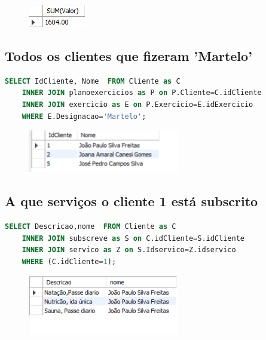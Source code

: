 \begin{figure}[h]
\begin{center}
\includegraphics[scale=0.7]{implementacao_fisica/soma.png}
\centering
\end{center}
\end{figure}

\subsection{Todos os clientes que fizeram 'Martelo'}
\begin{lstlisting}[language=SQL]
SELECT IdCliente, Nome  FROM Cliente as C
	INNER JOIN planoexercicios as P on P.Cliente=C.idCliente
	INNER JOIN exercicio as E on P.Exercicio=E.idExercicio
	WHERE E.Designacao='Martelo';
\end{lstlisting}

\begin{figure}[h]
\begin{center}
\includegraphics[scale=1.0]{implementacao_fisica/ClientesMartelo.png} 
\centering
\end{center}
\end{figure}

\subsection{A que serviços o cliente 1 está subscrito}
\begin{lstlisting}[language=SQL]
SELECT Descricao,nome  FROM Cliente as C
	INNER JOIN subscreve as S on C.idCliente=S.idCliente
    INNER JOIN servico as Z on S.Idservico=Z.idservico
    WHERE (C.idCliente=1);
\end{lstlisting}

\begin{figure}[h]
\begin{center}
\includegraphics[scale=1.0]{implementacao_fisica/Servicoscliente1.png} 
\centering
\end{center}
\end{figure}

